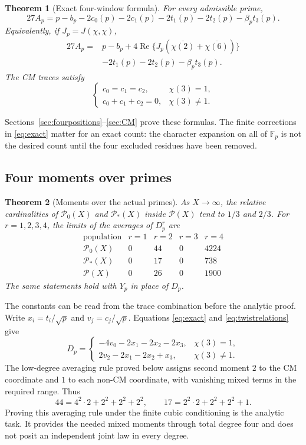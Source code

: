 \documentclass[11pt]{article}
\newtheorem{theorem}{Theorem}[section]
\theoremstyle{definition}\newtheorem{definition}[theorem]{Definition}
\newcommand{\Fp}{\mathbb F_p}
\newcommand{\Pcal}{\mathcal P}
\newcommand{\Rea}{\operatorname{Re}}
\begin{document}
\begin{theorem}[Exact four-window formula]\label{thm:exact}
For every admissible prime,
\begin{equation}\label{eq:exact}
 27A_p=p-b_p-2c_0(p)-2c_1(p)
                    -2t_1(p)-2t_2(p)-\beta_p t_3(p).
\end{equation}
Equivalently, if $J_p=J(\chi,\chi)$,
\begin{align}
 27A_p={}&p-b_p+
 4\Rea\{J_p(\overline{\chi(2)}+\overline{\chi(6)})\}
 \nonumber\\[-2pt]
 &-2t_1(p)-2t_2(p)-\beta_p t_3(p).
 \label{eq:jacobi-form}
\end{align}
The CM traces satisfy
\begin{equation}\label{eq:twistrelations}
 \begin{cases}
 c_0=c_1=c_2,& \chi(3)=1,\\
 c_0+c_1+c_2=0,& \chi(3)\ne1.
 \end{cases}
\end{equation}
\end{theorem}
Sections~\ref{sec:fourpositions}--\ref{sec:CM} prove these formulas.
The finite corrections in \eqref{eq:exact} matter for an exact count:
the character expansion on all of $\Fp$ is not the desired count
until the four excluded residues have been removed.

\subsection{Four moments over primes}
\begin{theorem}[Moments over the actual primes]\label{thm:moments}
As $X\to\infty$, the relative cardinalities of $\Pcal_0(X)$ and
$\Pcal_*(X)$ inside $\Pcal(X)$ tend to $1/3$ and $2/3$.
For $r=1,2,3,4$, the limits of the averages of $D_p^r$ are
\[
 \begin{array}{c|rrrr}
 \text{population}&r=1&r=2&r=3&r=4\\ \hline
 \Pcal_0(X)&0&44&0&4224\\
 \Pcal_*(X)&0&17&0&738\\
 \Pcal(X)&0&26&0&1900
 \end{array}
\]
The same statements hold with $Y_p$ in place of $D_p$.
\end{theorem}
The constants can be read from the trace combination before the analytic
proof. Write $x_i=t_i/\sqrt p$ and $v_j=c_j/\sqrt p$. Equations
\eqref{eq:exact} and \eqref{eq:twistrelations} give
\[
 D_p=\begin{cases}
 -4v_0-2x_1-2x_2-2x_3,&\chi(3)=1,\\
 2v_2-2x_1-2x_2+x_3,&\chi(3)\ne1.
 \end{cases}
\]
The low-degree averaging rule proved below assigns second moment $2$ to
the CM coordinate and $1$ to each non-CM coordinate, with vanishing mixed
terms in the required range. Thus
\[
 44=4^2\cdot2+2^2+2^2+2^2,\qquad
 17=2^2\cdot2+2^2+2^2+1.
\]
Proving this averaging rule under the finite cubic conditioning is the
analytic task. It provides the needed mixed moments through total degree
four and does not posit an independent joint law in every degree.
\end{document}
